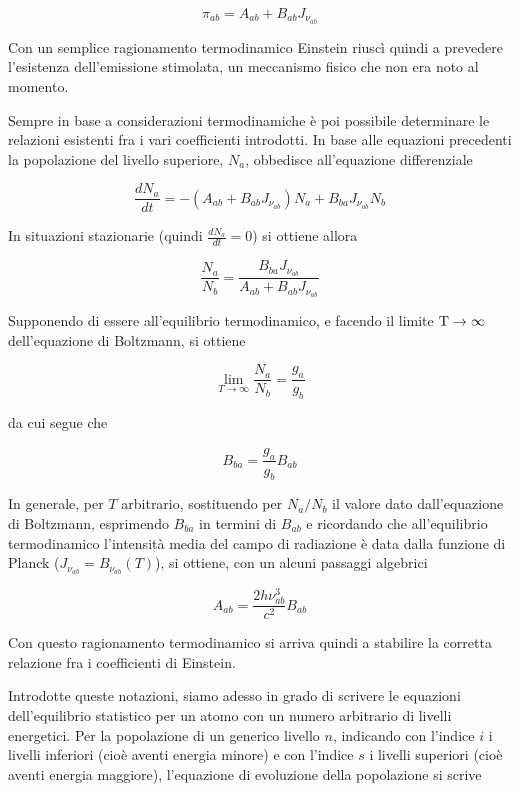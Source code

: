 \begin{equation*}
  \pi_{ab}=A_{ab} + B_{ab} J_{\nu_{ab}}
\end{equation*}

Con un semplice ragionamento termodinamico Einstein riuscì quindi a prevedere l'esistenza dell'emissione stimolata, un meccanismo fisico che non era noto al momento.

Sempre in base a considerazioni termodinamiche è poi possibile determinare le relazioni esistenti fra i vari coefficienti introdotti. In base alle equazioni precedenti la popolazione del livello superiore, $N_a$, obbedisce all'equazione differenziale

\begin{equation*}
  \frac{dN_a}{dt}=-(A_{ab} + B_{ab}J_{\nu_{ab}})N_a + B_{ba}J_{\nu_{ab}}N_b
\end{equation*}

In situazioni stazionarie (quindi $\frac{dN_a}{dt}=0$) si ottiene allora

\begin{equation*}
  \frac{N_a}{N_b}=\frac{B_{ba} J_{\nu_{ab}}}{A_{ab} + B_{ab}J_{\nu_{ab}}}
\end{equation*}

Supponendo di essere all'equilibrio termodinamico, e facendo il limite $\rm T \to \infty$ dell'equazione di Boltzmann, si ottiene

$$\lim_{T \to \infty} \frac{N_a}{N_b}=\frac{g_a}{g_b}$$

da cui segue che

$$B_{ba}=\frac{g_a}{g_b} B_{ab}$$

In generale, per $T$ arbitrario, sostituendo per $N_a/N_b$ il valore dato dall'equazione di Boltzmann, esprimendo $B_{ba}$ in termini di $B_{ab}$ e ricordando che all'equilibrio termodinamico l'intensità media del campo di radiazione è data dalla funzione di Planck ($J_{\nu_{ab}}=B_{\nu_{ab}}(T)$), si
ottiene, con un alcuni passaggi algebrici

$$A_{ab}=\frac{2h \nu_{ab}^3}{c^2} B_{ab}$$

Con questo ragionamento termodinamico si arriva quindi a stabilire la corretta
relazione fra i coefficienti di Einstein.

\vspace{0.2cm}Introdotte queste notazioni, siamo adesso in grado di scrivere le equazioni dell'equilibrio statistico per un atomo con un numero arbitrario di livelli energetici. Per la popolazione di un generico livello $n$, indicando con l'indice $i$ i livelli inferiori (cioè aventi energia minore) e con l'indice $s$ i livelli superiori (cioè aventi energia maggiore), l'equazione di evoluzione della popolazione si scrive

